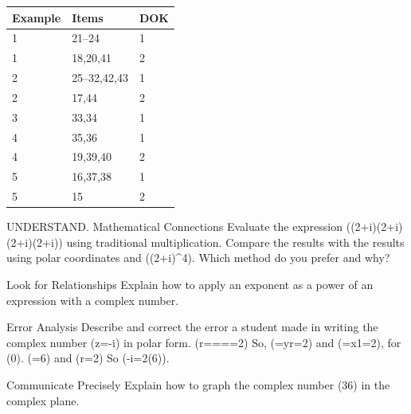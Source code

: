 \documentclass{article}
\newenvironment{item-analysis}{}{}      %
\newenvironment{practice}[2]{}{}        %
\newcommand{\answer}[1]{}               %
\newcommand{\te}[1]{}                   %
\begin{document}
\begin{item-analysis}
\begin{tabular}{lll}
\toprule
Example & Items & DOK \\
\midrule
1 & 21--24 & 1 \\
1 & 18,20,41 & 2 \\
2 & 25--32,42,43 & 1 \\
2 & 17,44 & 2 \\
3 & 33,34 & 1 \\
4 & 35,36 & 1 \\
4 & 19,39,40 & 2 \\
5 & 16,37,38 & 1 \\
5 & 15 & 2 \\
\bottomrule
\end{tabular}
\end{item-analysis}
\begin{practice}{15}{2}
UNDERSTAND. Mathematical Connections Evaluate the expression ((2+i)(2+i)(2+i)(2+i)) using traditional multiplication. Compare the results with the results using polar coordinates and ((2+i)^4). Which method do you prefer and why?
\answer{(-7+24i); the results are the same; student preferences will vary}
\end{practice}
\begin{practice}{16}{1}
Look for Relationships Explain how to apply an exponent as a power of an expression with a complex number.
\answer{Use the formula (z^n=r^n\operatorname{cis}n\theta).}
\end{practice}
\begin{practice}{17}{2}
Error Analysis Describe and correct the error a student made in writing the complex number (z=-i) in polar form.
(r====2)
So, (\sin\theta=\frac yr=2) and (\cos\theta=\frac x1=2),
for (0\leq\theta{}\pi).
(\theta=\frac{5\pi}6) and (r=2)
So (-i=2(\frac{5\pi}6)).
\te{Student work on gray curled note with red X. Printed cosine denominator appears as 1; likely r is intended.}
\answer{The student found the argument theta to be (\frac{5\pi}6), when it should have been (\frac{11\pi}6), so the answer should be (2\operatorname{cis}(\frac{11\pi}6)).}
\end{practice}
\begin{practice}{18}{2}
Communicate Precisely Explain how to graph the complex number (3\frac{5\pi}6) in the complex plane.
\answer{Draw a segment 3 units long from the origin at an angle of (\frac{5\pi}6) with the real axis.}
\end{practice}
\end{document}
